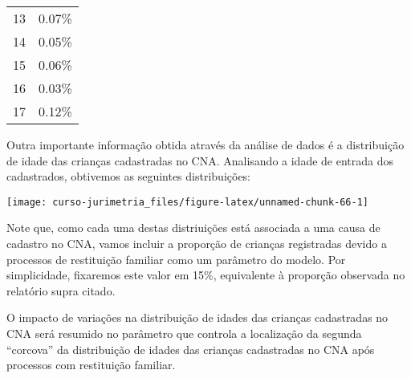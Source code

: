 \documentclass[]{book}
\begin{document}
\begin{longtable}[]{@{}cc@{}}
\begin{minipage}[t]{0.10\columnwidth}
13
\strut\end{minipage} &
\begin{minipage}[t]{0.14\columnwidth}\centering\strut
0.07\%
\strut\end{minipage}\tabularnewline
\begin{minipage}[t]{0.10\columnwidth}\centering\strut
14
\strut\end{minipage} &
\begin{minipage}[t]{0.14\columnwidth}\centering\strut
0.05\%
\strut\end{minipage}\tabularnewline
\begin{minipage}[t]{0.10\columnwidth}\centering\strut
15
\strut\end{minipage} &
\begin{minipage}[t]{0.14\columnwidth}\centering\strut
0.06\%
\strut\end{minipage}\tabularnewline
\begin{minipage}[t]{0.10\columnwidth}\centering\strut
16
\strut\end{minipage} &
\begin{minipage}[t]{0.14\columnwidth}\centering\strut
0.03\%
\strut\end{minipage}\tabularnewline
\begin{minipage}[t]{0.10\columnwidth}\centering\strut
17
\strut\end{minipage} &
\begin{minipage}[t]{0.14\columnwidth}\centering\strut
0.12\%
\strut\end{minipage}\tabularnewline
\bottomrule
\end{longtable}

Outra importante informação obtida através da análise de dados é a
distribuição de idade das crianças cadastradas no CNA. Analisando a
idade de entrada dos cadastrados, obtivemos as seguintes distribuições:

\begin{center}\texttt{[image: curso-jurimetria\_files/figure-latex/unnamed-chunk-66-1]} \end{center}

Note que, como cada uma destas distriuições está associada a uma causa
de cadastro no CNA, vamos incluir a proporção de crianças registradas
devido a processos de restituição familiar como um parâmetro do modelo.
Por simplicidade, fixaremos este valor em 15\%, equivalente à proporção
observada no relatório supra citado.

O impacto de variações na distribuição de idades das crianças
cadastradas no CNA será resumido no parâmetro que controla a localização
da segunda ``corcova'' da distribuição de idades das crianças
cadastradas no CNA após processos com restituição familiar.
\end{document}

